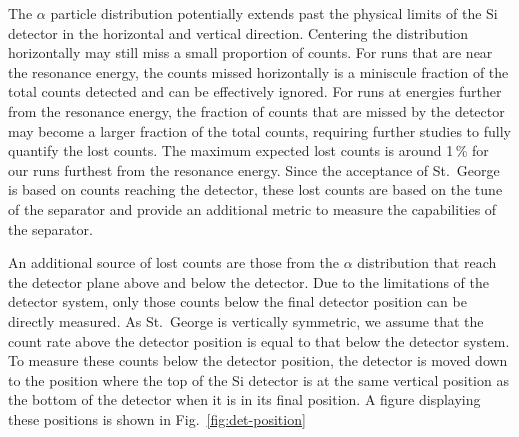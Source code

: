 The $\alpha$ particle distribution potentially extends past the physical
limits of the Si detector in the horizontal and vertical direction.
Centering the distribution horizontally may still miss a small
proportion of counts. For runs that are near the resonance energy, the
counts missed horizontally is a miniscule fraction of the total counts
detected and can be effectively ignored. For runs at energies further
from the resonance energy, the fraction of counts that are missed by the
detector may become a larger fraction of the total counts, requiring
further studies to fully quantify the lost counts. The maximum expected
lost counts is around 1\,\% for our runs furthest from the resonance
energy. Since the acceptance of St.\ George is based on counts reaching
the detector, these lost counts are based on the tune of the separator
and provide an additional metric to measure the capabilities of the
separator.

An additional source of lost counts are those from the $\alpha$
distribution that reach the detector plane above and below the detector.
Due to the limitations of the detector system, only those counts below
the final detector position can be directly measured. As St.\ George is
vertically symmetric, we assume that the count rate above the detector
position is equal to that below the detector system. To measure these
counts below the detector position, the detector is moved down to the
position where the top of the Si detector is at the same vertical
position as the bottom of the detector when it is in its final position.
A figure displaying these positions is shown in
Fig.~\ref{fig:det-position}

